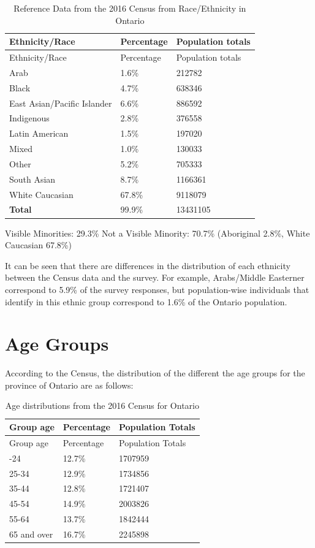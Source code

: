 \documentclass[
]{article}
\begin{document}
\hypertarget{tbl-races}{}
\begin{longtable}[]{@{}lll@{}}
\caption{\label{tbl-races}Reference Data from the 2016 Census from
Race/Ethnicity in Ontario}\tabularnewline
\toprule\noalign{}
Ethnicity/Race & Percentage & Population totals \\
\midrule\noalign{}
\endfirsthead
\toprule\noalign{}
Ethnicity/Race & Percentage & Population totals \\
\midrule\noalign{}
\endhead
\bottomrule\noalign{}
\endlastfoot
Arab & 1.6\% & 212782 \\
Black & 4.7\% & 638346 \\
East Asian/Pacific Islander & 6.6\% & 886592 \\
Indigenous & 2.8\% & 376558 \\
Latin American & 1.5\% & 197020 \\
Mixed & 1.0\% & 130033 \\
Other & 5.2\% & 705333 \\
South Asian & 8.7\% & 1166361 \\
White Caucasian & 67.8\% & 9118079 \\
\textbf{Total} & 99.9\% & 13431105 \\
\end{longtable}

Visible Minorities: 29.3\% Not a Visible Minority: 70.7\% (Aboriginal
2.8\%, White Caucasian 67.8\%)

It can be seen that there are differences in the distribution of each
ethnicity between the Census data and the survey. For example,
Arabs/Middle Easterner correspond to 5.9\% of the survey responses, but
population-wise individuals that identify in this ethnic group
correspond to 1.6\% of the Ontario population.

\hypertarget{age-groups}{%
\section{Age Groups}\label{age-groups}}

According to the Census, the distribution of the different the age
groups for the province of Ontario are as follows:

\begin{longtable}[]{@{}lll@{}}
\caption{Age distributions from the 2016 Census for
Ontario}\tabularnewline
\toprule\noalign{}
Group age & Percentage & Population Totals \\
\midrule\noalign{}
\endfirsthead
\toprule\noalign{}
Group age & Percentage & Population Totals \\
\midrule\noalign{}
\endhead
\bottomrule\noalign{}
\endlastfoot
15-24 & 12.7\% & 1707959 \\
25-34 & 12.9\% & 1734856 \\
35-44 & 12.8\% & 1721407 \\
45-54 & 14.9\% & 2003826 \\
55-64 & 13.7\% & 1842444 \\
65 and over & 16.7\% & 2245898 \\
\end{longtable}
\end{document}
